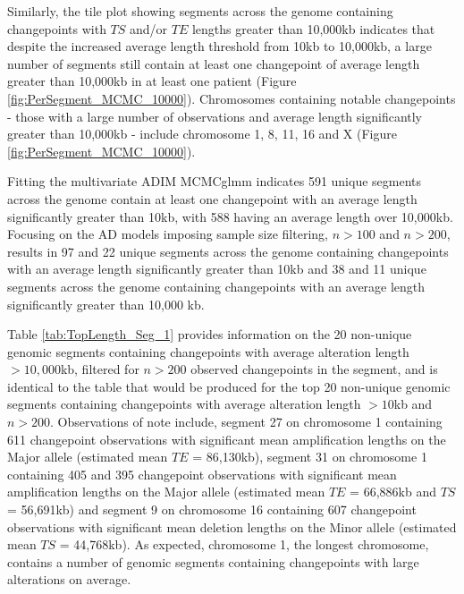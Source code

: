 Similarly,  the tile plot showing segments across the genome containing changepoints with $TS$ and/or $TE$ lengths greater than 10,000kb indicates that despite the increased average length threshold from 10kb to 10,000kb, a large number of segments still contain at least one changepoint of average length greater than 10,000kb in at least one patient (Figure \ref{fig:PerSegment_MCMC_10000}). Chromosomes containing notable changepoints - those with a large number of observations and average length significantly greater than 10,000kb - include chromosome 1, 8, 11, 16 and X (Figure \ref{fig:PerSegment_MCMC_10000}).

Fitting the multivariate ADIM MCMCglmm indicates 591 unique segments across the genome contain at least one changepoint with an average length significantly greater than 10kb, with 588 having an average length over 10,000kb. Focusing on the AD models imposing sample size filtering, $n > 100$ and $n > 200$, results in 97 and 22 unique segments across the genome containing changepoints with an average length significantly greater than 10kb and 38 and 11 unique segments across the genome containing changepoints with an average length significantly greater than 10,000 kb. 

Table \ref{tab:TopLength_Seg_1} provides information on the 20 non-unique genomic segments containing changepoints with average alteration length $> 10,000$kb, filtered for $n > 200$ observed changepoints in the segment, and is identical to the table that would be produced for the top 20 non-unique genomic segments containing changepoints with average alteration length $> 10$kb and $n > 200$. Observations of note include, segment 27 on chromosome 1 containing 611 changepoint observations with significant mean amplification lengths on the Major allele (estimated mean $TE$ = 86,130kb), segment 31 on chromosome 1 containing 405 and 395 changepoint observations with significant mean amplification lengths on the Major allele (estimated mean $TE$ = 66,886kb and $TS$ = 56,691kb) and segment 9 on chromosome 16 containing 607 changepoint observations with significant mean deletion lengths on the Minor allele (estimated mean $TS$ = 44,768kb). As expected, chromosome 1, the longest chromosome, contains a number of genomic segments containing changepoints with large alterations on average. 

